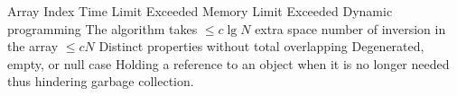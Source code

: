 %
%


 Array 
 Index
 Time Limit Exceeded
 Memory Limit Exceeded
 Dynamic programming 
 The algorithm takes $\leq c \lg N$ extra space
 number of inversion in the array $\leq cN$
 Distinct properties without total overlapping
 Degenerated, empty, or null case
 Holding a reference to an object when it is no longer needed thus hindering garbage collection. 
